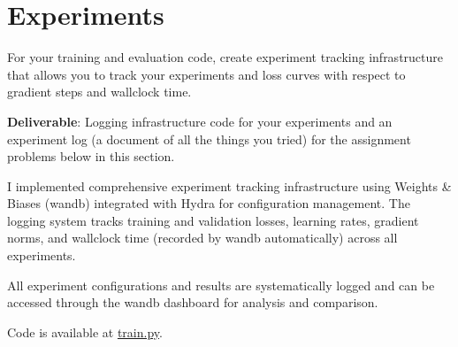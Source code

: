 \section{Experiments}


For your training and evaluation code, create experiment tracking infrastructure that allows you to track your experiments and loss curves with respect to gradient steps and wallclock time.

\textbf{Deliverable}: Logging infrastructure code for your experiments and an experiment log (a document of all the things you tried) for the assignment problems below in this section.

\begin{answer}
I implemented comprehensive experiment tracking infrastructure using Weights \& Biases (wandb) integrated with Hydra for configuration management. The logging system tracks training and validation losses, learning rates, gradient norms, and wallclock time (recorded by wandb automatically) across all experiments.

All experiment configurations and results are systematically logged and can be accessed through the wandb dashboard for analysis and comparison.

Code is available at \href{https://github.com/donglinkang2021/assignment1-basics/blob/main/train.py}{train.py}.
\end{answer}

